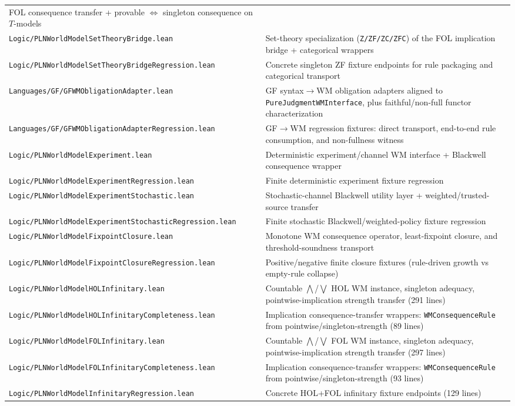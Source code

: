 \documentclass[]{article}
\newcommand{\code}[1]{\texttt{#1}}
\begin{document}
\begin{longtable}{p{}p{}}
  FOL consequence transfer +
  provable $\Leftrightarrow$ singleton consequence on $T$-models \\
\code{Logic/PLNWorldModelSetTheoryBridge.lean} &
  Set-theory specialization (\code{Z/ZF/ZC/ZFC}) of the FOL
  implication bridge + categorical wrappers \\
\code{Logic/PLNWorldModelSetTheoryBridgeRegression.lean} &
  Concrete singleton ZF fixture endpoints for rule packaging
  and categorical transport \\
\code{Languages/GF/GFWMObligationAdapter.lean} &
  GF syntax$\rightarrow$WM obligation adapters aligned to
  \code{PureJudgmentWMInterface}, plus
  faithful/non-full functor characterization \\
\code{Languages/GF/GFWMObligationAdapterRegression.lean} &
  GF$\rightarrow$WM regression fixtures: direct transport, end-to-end
  rule consumption, and non-fullness witness \\
\code{Logic/PLNWorldModelExperiment.lean} &
  Deterministic experiment/channel WM interface + Blackwell consequence wrapper \\
\code{Logic/PLNWorldModelExperimentRegression.lean} &
  Finite deterministic experiment fixture regression \\
\code{Logic/PLNWorldModelExperimentStochastic.lean} &
  Stochastic-channel Blackwell utility layer + weighted/trusted-source transfer \\
\code{Logic/PLNWorldModelExperimentStochasticRegression.lean} &
  Finite stochastic Blackwell/weighted-policy fixture regression \\
\code{Logic/PLNWorldModelFixpointClosure.lean} &
  Monotone WM consequence operator, least-fixpoint closure, and
  threshold-soundness transport \\
\code{Logic/PLNWorldModelFixpointClosureRegression.lean} &
  Positive/negative finite closure fixtures (rule-driven growth vs empty-rule collapse) \\
\code{Logic/PLNWorldModelHOLInfinitary.lean} &
  Countable $\bigwedge$/$\bigvee$ HOL WM instance, singleton adequacy,
  pointwise-implication strength transfer (291 lines) \\
\code{Logic/PLNWorldModelHOLInfinitaryCompleteness.lean} &
  Implication consequence-transfer wrappers: \code{WMConsequenceRule} from
  pointwise/singleton-strength (89 lines) \\
\code{Logic/PLNWorldModelFOLInfinitary.lean} &
  Countable $\bigwedge$/$\bigvee$ FOL WM instance, singleton adequacy,
  pointwise-implication strength transfer (297 lines) \\
\code{Logic/PLNWorldModelFOLInfinitaryCompleteness.lean} &
  Implication consequence-transfer wrappers: \code{WMConsequenceRule} from
  pointwise/singleton-strength (93 lines) \\
\code{Logic/PLNWorldModelInfinitaryRegression.lean} &
  Concrete HOL+FOL infinitary fixture endpoints (129 lines) \\
\hline
\end{longtable}
\end{document}
